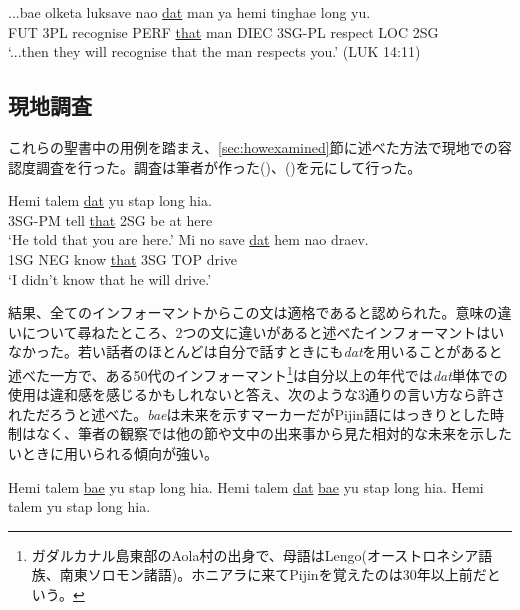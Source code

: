 \begin{exe}
\ex
\gll ...bae olketa luksave nao \underline{dat} man ya hemi tinghae long yu.\\
FUT 3PL recognise PERF \underline{that} man DIEC 3SG-PL respect LOC 2SG\\
\glt `...then they will recognise that the man respects you.' (LUK 14:11)
\end{exe}


\subsection{現地調査}\label{sec:datfield}

これらの聖書中の用例を踏まえ、\ref{sec:howexamined}節に述べた方法で現地での容認度調査を行った。調査は筆者が作った()、()を元にして行った。

\begin{exe}
\ex\label{dat1}
\gll Hemi talem \underline{dat} yu stap long hia.\\
3SG-PM tell \underline{that} 2SG be at here\\
\glt `He told that you are here.'
\ex\label{dat2}
\gll Mi no save \underline{dat} hem nao draev.\\
1SG NEG know \underline{that} 3SG TOP drive\\
\glt `I didn't know that he will drive.'
\end{exe}

結果、全てのインフォーマントからこの文は適格であると認められた。意味の違いについて尋ねたところ、2つの文に違いがあると述べたインフォーマントはいなかった。若い話者のほとんどは自分で話すときにも\textit{dat}を用いることがあると述べた一方で、ある50代のインフォーマント\footnote{ガダルカナル島東部のAola村の出身で、母語はLengo(オーストロネシア語族、南東ソロモン諸語)。ホニアラに来てPijinを覚えたのは30年以上前だという。}は自分以上の年代では\textit{dat}単体での使用は違和感を感じるかもしれないと答え、次のような3通りの言い方なら許されただろうと述べた。\textit{bae}は未来を示すマーカーだがPijin語にはっきりとした時制はなく\citep{eric}、筆者の観察では他の節や文中の出来事から見た相対的な未来を示したいときに用いられる傾向が強い。

\begin{exe}
 Hemi talem \underline{bae} yu stap long hia.
 Hemi talem \underline{dat} \underline{bae} yu stap long hia.
 Hemi talem yu stap long hia.
\end{exe}

